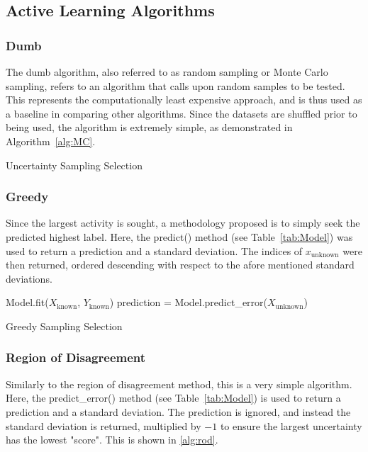     \subsection{Active Learning Algorithms}

    \subsubsection{Dumb}

    The dumb algorithm, also referred to as random sampling or Monte Carlo sampling, refers to an algorithm that calls upon random samples to be tested. This represents the computationally least expensive approach, and is thus used as a baseline in comparing other algorithms. Since the datasets are shuffled prior to being used, the algorithm is extremely simple, as demonstrated in Algorithm~\ref{alg:MC}.

    \begin{algorithm}[h]
        \caption{Uncertainty Sampling Selection}
        \label{alg:MC}\SetAlgoLined
    \end{algorithm}

    \subsubsection{Greedy}
    Since the largest activity is sought, a methodology proposed is to simply seek the predicted highest label. Here, the predict() method (see Table~\ref{tab:Model}) was used to return a prediction and a standard deviation. The indices of $x_\mathrm{unknown}$ were then returned, ordered descending with respect to the afore mentioned standard deviations.

    \begin{algorithm}[h]
        Model.fit($X_\mathrm{known}$, $Y_\mathrm{known}$)\;
        prediction = Model.predict\_error($X_\mathrm{unknown}$)\;
        \caption{Greedy Sampling Selection}
        \label{alg:greedy}\SetAlgoLined
    \end{algorithm}

    \subsubsection{Region of Disagreement}
    Similarly to the region of disagreement method, this is a very simple algorithm. Here, the predict\_error() method (see Table~\ref{tab:Model}) is used to return a prediction and a standard deviation. The prediction is ignored, and instead the standard deviation is returned, multiplied by $-1$ to ensure the largest uncertainty has the lowest "score". This is shown in \ref{alg:rod}.

